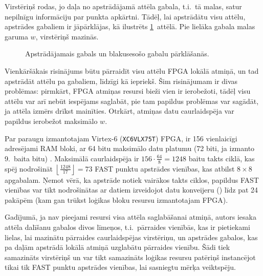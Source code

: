 Virstēriņš rodas, jo daļa no apstrādājamā attēla gabala, t.i.~tā malas,
satur nepilnīgu informāciju par punkta apkārtni. Tādēļ, lai apstrādātu
visu attēlu, apstrādes gabaliem ir jāpārklājas, kā ilustrēts
\ref{fig:chunks}~attēlā. Pie lielāka gabala malas garuma $w$,
virstēriņš mazinās.
\begin{figure}[tbh]
	\centering
	\def\svgwidth{0.9\linewidth}
	{\small}
	\caption{Apstrādājamais gabals un blakusesošo gabalu pārklāšanās.}
	\label{fig:chunks}
\end{figure}

Vienkāršākais risinājums būtu pārraidīt visu attēlu FPGA lokālā atmiņā,
un tad apstrādāt attēlu pa gabaliem, līdzīgi kā iepriekš. Šim
risinājumam ir divas problēmas: pirmkārt, FPGA atmiņas resursi bieži
vien ir ierobežoti, tādēļ visu attēlu var arī nebūt iespējams saglabāt,
pie tam papildus problēmas var sagādāt, ja attēla izmērs drīkst mainīties.
Otrkārt, atmiņas datu caurlaidspēja var papildus ierobežot
maksimālo $w$.

Par paraugu izmantotajam Virtex-6 (\texttt{XC6VLX75T}) FPGA,
ir 156 vienlaicīgi adresējami RAM bloki, ar
64 bitu maksimālo datu platumu (72 biti, ja izmanto 9.~baita bitu)%
\cite{Virtex6}. Maksimālā caurlaidspēja ir $156 \cdot \frac{64}{8} = 1248$
baitu takts ciklā, kas spēj nodrošināt
$\left\lfloor \frac{1248}{17} \right\rfloor = 73$ FAST punktu apstrādes vienības,
kas atbilst $8 \times 8$ apgabalam.
Ņemot vērā, ka apstrāde notiek vairākos takts ciklos, papildus
FAST vienības var tikt nodrošinātas ar datiem izveidojot datu
konveijeru () līdz pat 24 pakāpēm
(kam gan trūkst loģikas bloku resursu izmantotajam FPGA).

Gadījumā, ja nav pieejami resursi visa attēla saglabāšanai atmiņā,
autors iesaka attēla dalīšanu gabalos divos līmeņos, t.i.~pārraides
vienībās, kas ir pietiekami lielas, lai mazinātu pārraides caurlaidspējas
virstēriņu, un apstrādes gabalos, kas pa daļām apstrādā lokālā atmiņā
uzglabātu pārraides vienību. Šādi tiek samazināts virstēriņš un var tikt
samazināts loģikas resursu patēriņš instancējot tikai tik FAST punktu 
apstrādes vienības, lai sasniegtu mērķa veiktspēju.

